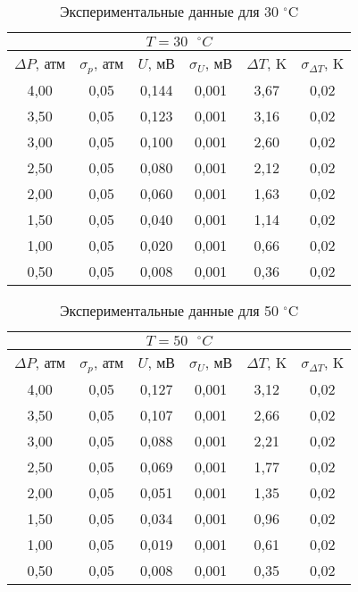 \documentclass[a4paper, 12pt]{article}
\begin{document}
\begin{enumerate}
    \begin{table}[ht!]
        \centering
        \begin{tabular}{|c|c|c|c|c|c|}
            \hline
            \multicolumn{6}{|c|}{$ T = 30 \text{ } ^\circ C $} \\ \hline
            $ \Delta P $, атм & $ \sigma_p $, атм & $ U $, мВ & $ \sigma_U $, мВ & $ \Delta T $, K & $ \sigma_{\Delta T} $, K \\ \hline
            4,00 & 0,05 & 0,144 & 0,001 & 3,67 & 0,02 \\ \hline
            3,50 & 0,05 & 0,123 & 0,001 & 3,16 & 0,02 \\ \hline
            3,00 & 0,05 & 0,100 & 0,001 & 2,60 & 0,02 \\ \hline
            2,50 & 0,05 & 0,080 & 0,001 & 2,12 & 0,02 \\ \hline
            2,00 & 0,05 & 0,060 & 0,001 & 1,63 & 0,02 \\ \hline
            1,50 & 0,05 & 0,040 & 0,001 & 1,14 & 0,02 \\ \hline
            1,00 & 0,05 & 0,020 & 0,001 & 0,66 & 0,02 \\ \hline
            0,50 & 0,05 & 0,008 & 0,001 & 0,36 & 0,02 \\ \hline
        \end{tabular}
        \caption{Экспериментальные данные для 30 $^\circ$C}
        \label{tab:30C}
    \end{table}
    
    \begin{table}[ht!]
        \centering
        \begin{tabular}{|c|c|c|c|c|c|}
            \hline
            \multicolumn{6}{|c|}{$ T = 50 \text{ } ^\circ C $} \\ \hline
            $ \Delta P $, атм & $ \sigma_p $, атм & $ U $, мВ & $ \sigma_U $, мВ & $ \Delta T $, K & $ \sigma_{\Delta T} $, K \\ \hline
            4,00 & 0,05 & 0,127 & 0,001 & 3,12 & 0,02 \\ \hline
            3,50 & 0,05 & 0,107 & 0,001 & 2,66 & 0,02 \\ \hline
            3,00 & 0,05 & 0,088 & 0,001 & 2,21 & 0,02 \\ \hline
            2,50 & 0,05 & 0,069 & 0,001 & 1,77 & 0,02 \\ \hline
            2,00 & 0,05 & 0,051 & 0,001 & 1,35 & 0,02 \\ \hline
            1,50 & 0,05 & 0,034 & 0,001 & 0,96 & 0,02 \\ \hline
            1,00 & 0,05 & 0,019 & 0,001 & 0,61 & 0,02 \\ \hline
            0,50 & 0,05 & 0,008 & 0,001 & 0,35 & 0,02 \\ \hline
        \end{tabular}
        \caption{Экспериментальные данные для 50 $^\circ$C}
        \label{tab:50C}
    \end{table}


\end{enumerate}
\end{document}
